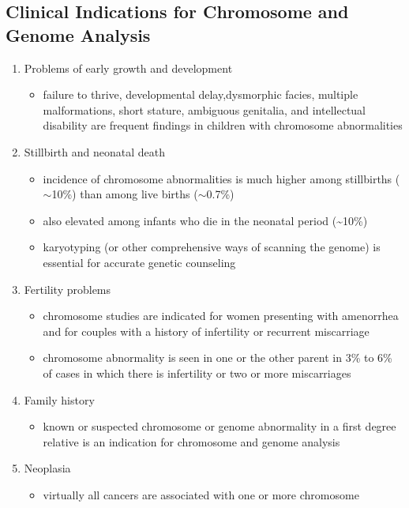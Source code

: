 \documentclass{scrartcl}
\begin{document}
\subsection{Clinical Indications for Chromosome and Genome Analysis}
\label{sec:orge76bd47}
\begin{enumerate}
\item Problems of early growth and development
\label{sec:org8b306c6}
\begin{itemize}
\item failure to thrive, developmental delay,dysmorphic facies, multiple
malformations, short stature, ambiguous genitalia, and
intellectual disability are frequent findings in children with
chromosome abnormalities
\end{itemize}
\item Stillbirth and neonatal death
\label{sec:org225db48}
\begin{itemize}
\item incidence of chromosome abnormalities is much higher among
stillbirths (\(\sim\)10\%) than among live births (\(\sim\)0.7\%)
\item also elevated among infants who die in the neonatal period (\textasciitilde{}10\%)
\item karyotyping (or other comprehensive ways of scanning the genome) is
essential for accurate genetic counseling
\end{itemize}
\item Fertility problems
\label{sec:org0be8ed1}
\begin{itemize}
\item chromosome studies are indicated for women presenting with
amenorrhea and for couples with a history of infertility or recurrent miscarriage
\item chromosome abnormality is seen in one or the other parent in 3\% to
6\% of cases in which there is infertility or two or more
miscarriages
\end{itemize}
\item Family history
\label{sec:org16cc032}
\begin{itemize}
\item known or suspected chromosome or genome abnormality in a first
degree relative is an indication for chromosome and genome analysis
\end{itemize}
\item Neoplasia
\label{sec:org7c92df4}
\begin{itemize}
\item virtually all cancers are associated with one or more chromosome

\end{itemize}
\end{enumerate}
\end{document}
